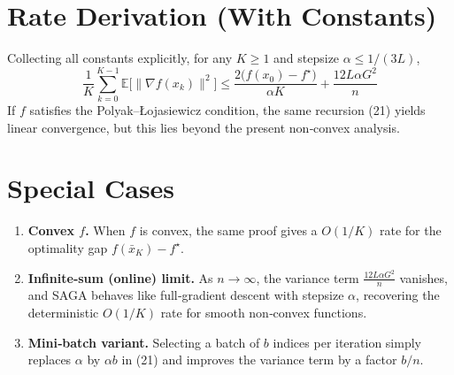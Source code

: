 \documentclass{article}
\newcommand{\E}{\mathbb{E}}
\begin{document}
\section*{Rate Derivation (With Constants)}
Collecting all constants explicitly, for any $K\ge1$ and stepsize $\alpha\le 1/(3L)$,
\[
\boxed{
\frac{1}{K}\sum_{k=0}^{K-1}\E\!\bigl[\|\nabla f(x_k)\|^{2}\bigr]
\le
\frac{2\bigl(f(x_0)-f^{\star}\bigr)}{\alpha K}
+\frac{12L\alpha G^{2}}{n}
}
\]
If $f$ satisfies the Polyak–Łojasiewicz condition, the same recursion (21) yields linear convergence, but this lies beyond the present non‑convex analysis.

\section*{Special Cases}
\begin{enumerate}[label=\arabic*.]
\item \textbf{Convex $f$.} When $f$ is convex, the same proof gives a $O(1/K)$ rate for the optimality gap $f(\bar x_K)-f^{\star}$.
\item \textbf{Infinite‑sum (online) limit.} As $n\to\infty$, the variance term $\frac{12L\alpha G^{2}}{n}$ vanishes, and SAGA behaves like full‑gradient descent with stepsize $\alpha$, recovering the deterministic $O(1/K)$ rate for smooth non‑convex functions.
\item \textbf{Mini‑batch variant.} Selecting a batch of $b$ indices per iteration simply replaces $\alpha$ by $\alpha b$ in (21) and improves the variance term by a factor $b/n$.
\end{enumerate}
\end{document}
